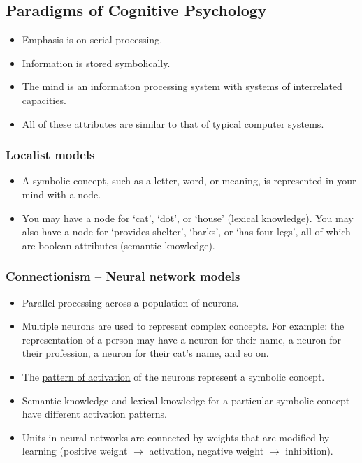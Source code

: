 \documentclass[]{article}
\begin{document}
		\subsection{Paradigms of Cognitive Psychology}
			\begin{itemize}
				\item Emphasis is on serial processing.
				\item Information is stored symbolically.
				\item The mind is an information processing system with systems of interrelated capacities.
				\item All of these attributes are similar to that of typical computer systems.
			\end{itemize}
			
			\subsubsection{Localist models}
				\begin{itemize}
					\item A symbolic concept, such as a letter, word, or meaning, is represented in your mind with a node.
					\item You may have a node for `cat', `dot', or `house' (lexical knowledge). You may also have a node for `provides shelter', `barks', or `has four legs', all of which are boolean attributes (semantic knowledge).
				\end{itemize}
				
			\subsubsection{Connectionism -- Neural network models}
				\begin{itemize}
					\item Parallel processing across a population of neurons.
					\item Multiple neurons are used to represent complex concepts. For example: the representation of a person may have a neuron for their name, a neuron for their profession, a neuron for their cat's name, and so on.
					\item The \underline{pattern of activation} of the neurons represent a symbolic concept.
					\item Semantic knowledge and lexical knowledge for a particular symbolic concept have different activation patterns.
					\item Units in neural networks are connected by weights that are modified by learning (positive weight $\to$ activation, negative weight $\to$ inhibition).
				\end{itemize}
		
\end{document}
